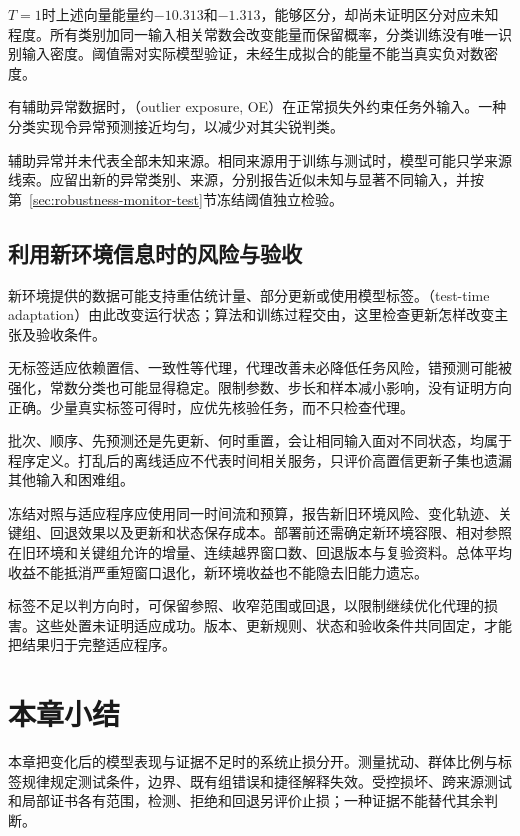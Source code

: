 $T=1$时上述向量能量约$-10.313$和$-1.313$，能够区分，却尚未证明区分对应未知程度。所有类别加同一输入相关常数会改变能量而保留概率，分类训练没有唯一识别输入密度。阈值需对实际模型验证，未经生成拟合的能量不能当真实负对数密度。

有辅助异常数据时，（outlier exposure, OE）在正常损失外约束任务外输入。一种分类实现令异常预测接近均匀，以减少对其尖锐判类。

辅助异常并未代表全部未知来源。相同来源用于训练与测试时，模型可能只学来源线索。应留出新的异常类别、来源，分别报告近似未知与显著不同输入，并按第~\ref{sec:robustness-monitor-test}节冻结阈值独立检验。

\subsection{利用新环境信息时的风险与验收}
\label{sec:robustness-adaptation}

新环境提供的数据可能支持重估统计量、部分更新或使用模型标签。（test-time adaptation）由此改变运行状态；算法和训练过程交由，这里检查更新怎样改变主张及验收条件。

无标签适应依赖置信、一致性等代理，代理改善未必降低任务风险，错预测可能被强化，常数分类也可能显得稳定。限制参数、步长和样本减小影响，没有证明方向正确。少量真实标签可得时，应优先核验任务，而不只检查代理。

批次、顺序、先预测还是先更新、何时重置，会让相同输入面对不同状态，均属于程序定义。打乱后的离线适应不代表时间相关服务，只评价高置信更新子集也遗漏其他输入和困难组。

冻结对照与适应程序应使用同一时间流和预算，报告新旧环境风险、变化轨迹、关键组、回退效果以及更新和状态保存成本。部署前还需确定新环境容限、相对参照在旧环境和关键组允许的增量、连续越界窗口数、回退版本与复验资料。总体平均收益不能抵消严重短窗口退化，新环境收益也不能隐去旧能力遗忘。

标签不足以判方向时，可保留参照、收窄范围或回退，以限制继续优化代理的损害。这些处置未证明适应成功。版本、更新规则、状态和验收条件共同固定，才能把结果归于完整适应程序。

\section{本章小结}
\label{sec:robustness-summary}

本章把变化后的模型表现与证据不足时的系统止损分开。测量扰动、群体比例与标签规律规定测试条件，边界、既有组错误和捷径解释失效。受控损坏、跨来源测试和局部证书各有范围，检测、拒绝和回退另评价止损；一种证据不能替代其余判断。

